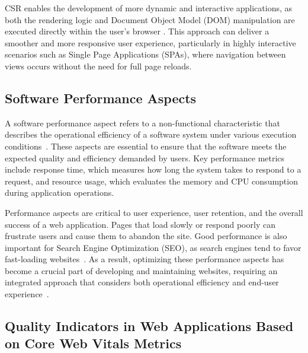 
CSR enables the development of more dynamic and interactive applications, as both the rendering logic and Document Object Model (DOM) manipulation are executed directly within the user's browser \cite{clientServerSide:2020}. This approach can deliver a smoother and more responsive user experience, particularly in highly interactive scenarios such as Single Page Applications (SPAs), where navigation between views occurs without the need for full page reloads.

\subsection{Software Performance Aspects}
\label{sec:performance_aspects}

A software performance aspect refers to a non-functional characteristic that describes the operational efficiency of a software system under various execution conditions~\cite{performanceAspects}. These aspects are essential to ensure that the software meets the expected quality and efficiency demanded by users. Key performance metrics include response time, which measures how long the system takes to respond to a request, and resource usage, which evaluates the memory and CPU consumption during application operations.

Performance aspects are critical to user experience, user retention, and the overall success of a web application. Pages that load slowly or respond poorly can frustrate users and cause them to abandon the site. Good performance is also important for Search Engine Optimization (SEO), as search engines tend to favor fast-loading websites~\cite{clientServerSide:2020}. As a result, optimizing these performance aspects has become a crucial part of developing and maintaining websites, requiring an integrated approach that considers both operational efficiency and end-user experience~\cite{pageExp:2022}.

\subsection{Quality Indicators in Web Applications Based on Core Web Vitals Metrics}
\label{sec:quality_indicators}

